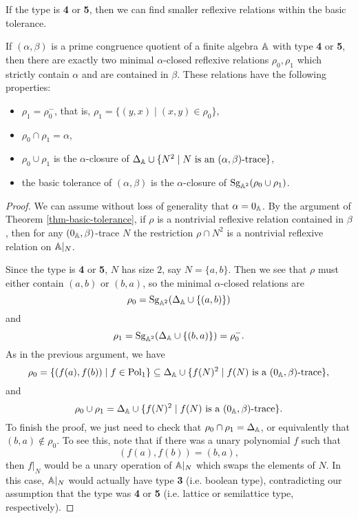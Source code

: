 \begin{appendices}
If the type is \textbf{4} or \textbf{5}, then we can find smaller reflexive relations within the basic tolerance.

\begin{thm}\label{thm-basic-reflexive} If $(\alpha,\beta)$ is a prime congruence quotient of a finite algebra $\mathbb{A}$ with type \textbf{4} or \textbf{5}, then there are exactly two minimal $\alpha$-closed reflexive relations $\rho_0, \rho_1$ which strictly contain $\alpha$ and are contained in $\beta$. These relations have the following properties:
\begin{itemize}
\item $\rho_1 = \rho_0^-$, that is, $\rho_1 = \{(y,x) \mid (x,y) \in \rho_0\}$,
\item $\rho_0 \cap \rho_1 = \alpha$,
\item $\rho_0 \cup \rho_1$ is the $\alpha$-closure of $\Delta_{\mathbb{A}} \cup \{N^2 \mid N \text{ is an $(\alpha,\beta)$-trace}\}$,
\item the basic tolerance of $(\alpha,\beta)$ is the $\alpha$-closure of $\operatorname{Sg}_{\mathbb{A}^2}(\rho_0 \cup \rho_1)$.
\end{itemize}
\end{thm}
\begin{proof} We can assume without loss of generality that $\alpha = 0_{\mathbb{A}}$. By the argument of Theorem \ref{thm-basic-tolerance}, if $\rho$ is a nontrivial reflexive relation contained in $\beta$, then for any $(0_{\mathbb{A}},\beta)$-trace $N$ the restriction $\rho \cap N^2$ is a nontrivial reflexive relation on $\mathbb{A}|_N$.

Since the type is \textbf{4} or \textbf{5}, $N$ has size $2$, say $N = \{a,b\}$. Then we see that $\rho$ must either contain $(a,b)$ or $(b,a)$, so the minimal $\alpha$-closed relations are
\[
\rho_0 = \operatorname{Sg}_{\mathbb{A}^2}(\Delta_{\mathbb{A}} \cup \{(a,b)\})
\]
and
\[
\rho_1 = \operatorname{Sg}_{\mathbb{A}^2}(\Delta_{\mathbb{A}} \cup \{(b,a)\}) = \rho_0^-.
\]
As in the previous argument, we have
\[
\rho_0 = \{(f(a), f(b)) \mid f \in \operatorname{Pol}_1\} \subseteq \Delta_{\mathbb{A}} \cup \{f(N)^2 \mid f(N) \text{ is a $(0_{\mathbb{A}},\beta)$-trace}\},
\]
and
\[
\rho_0 \cup \rho_1 = \Delta_{\mathbb{A}} \cup \{f(N)^2 \mid f(N) \text{ is a $(0_{\mathbb{A}},\beta)$-trace}\}.
\]
To finish the proof, we just need to check that $\rho_0 \cap \rho_1 = \Delta_{\mathbb{A}}$, or equivalently that $(b,a) \not\in \rho_0$. To see this, note that if there was a unary polynomial $f$ such that
\[
(f(a), f(b)) = (b,a),
\]
then $f|_N$ would be a unary operation of $\mathbb{A}|_N$ which swaps the elements of $N$. In this case, $\mathbb{A}|_N$ would actually have type \textbf{3} (i.e. boolean type), contradicting our assumption that the type was \textbf{4} or \textbf{5} (i.e. lattice or semilattice type, respectively).
\end{proof}


\end{appendices}
